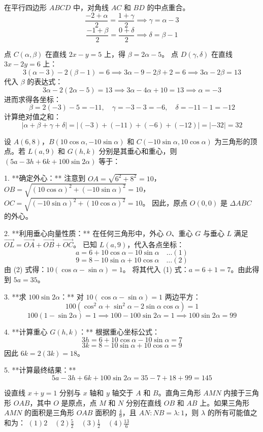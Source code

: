 \begin{questions}
\begin{solution}
在平行四边形 $ABCD$ 中，对角线 $AC$ 和 $BD$ 的中点重合。
\[
\frac{-2 + \alpha}{2} = \frac{1 + \gamma}{2} \implies \gamma = \alpha - 3
\]
\[
\frac{-1 + \beta}{2} = \frac{0 + \delta}{2} \implies \delta = \beta - 1
\]

点 $C(\alpha, \beta)$ 在直线 $2x - y = 5$ 上，得 $\beta = 2\alpha - 5$。
点 $D(\gamma, \delta)$ 在直线 $3x - 2y = 6$ 上：
\[
3(\alpha - 3) - 2(\beta - 1) = 6 \implies 3\alpha - 9 - 2\beta + 2 = 6 \implies 3\alpha - 2\beta = 13
\]
代入 $\beta$ 的表达式：
\[
3\alpha - 2(2\alpha - 5) = 13 \implies 3\alpha - 4\alpha + 10 = 13 \implies \alpha = -3
\]
进而求得各坐标：
\[
\beta = 2(-3) - 5 = -11, \quad \gamma = -3 - 3 = -6, \quad \delta = -11 - 1 = -12
\]
计算绝对值之和：
\[
|\alpha + \beta + \gamma + \delta| = |(-3) + (-11) + (-6) + (-12)| = |-32| = 32
\]
\end{solution}

\question
设 $A(6, 8)$，$B(10 \cos \alpha, -10 \sin \alpha)$ 和 $C(-10 \sin \alpha, 10 \cos \alpha)$ 为三角形的顶点。若 $L(a, 9)$ 和 $G(h, k)$ 分别是其垂心和重心，则 $(5a - 3h + 6k + 100 \sin 2\alpha)$ 等于：

\begin{solution}
1. **确定外心：**
注意到 $OA = \sqrt{6^2 + 8^2} = 10$，$OB = \sqrt{(10\cos\alpha)^2 + (-10\sin\alpha)^2} = 10$，$OC = \sqrt{(-10\sin\alpha)^2 + (10\cos\alpha)^2} = 10$。
因此，原点 $O(0, 0)$ 是 $\Delta ABC$ 的外心。

2. **利用垂心向量性质：**
在任何三角形中，外心 $O$、重心 $G$ 与垂心 $L$ 满足 $\vec{OL} = \vec{OA} + \vec{OB} + \vec{OC}$。
已知 $L(a, 9)$，代入各点坐标：
\[
a = 6 + 10\cos\alpha - 10\sin\alpha \quad \dots (1)
\]
\[
9 = 8 - 10\sin\alpha + 10\cos\alpha \quad \dots (2)
\]
由 (2) 式得：$10(\cos\alpha - \sin\alpha) = 1$。
将其代入 (1) 式：$a = 6 + 1 = 7$。由此得到 $5a = 35$。

3. **求 $100\sin 2\alpha$：**
对 $10(\cos\alpha - \sin\alpha) = 1$ 两边平方：
\[
100(\cos^2\alpha + \sin^2\alpha - 2\sin\alpha\cos\alpha) = 1
\]
\[
100(1 - \sin 2\alpha) = 1 \implies 100 - 100\sin 2\alpha = 1 \implies 100\sin 2\alpha = 99
\]

4. **计算重心 $G(h, k)$：**
根据重心坐标公式：
\[
3h = 6 + 10\cos\alpha - 10\sin\alpha = 7
\]
\[
3k = 8 - 10\sin\alpha + 10\cos\alpha = 9
\]
因此 $6k = 2(3k) = 18$。

5. **计算最终结果：**
\[
5a - 3h + 6k + 100\sin 2\alpha = 35 - 7 + 18 + 99 = 145
\]
\end{solution}
    \question
设直线 $x + y = 1$ 分别与 $x$ 轴和 $y$ 轴交于 $A$ 和 $B$。直角三角形 $AMN$ 内接于三角形 $OAB$，其中 $O$ 是原点，点 $M$ 和 $N$ 分别在直线 $OB$ 和 $AB$ 上。如果三角形 $AMN$ 的面积是三角形 $OAB$ 面积的 $\frac{4}{9}$，且 $AN : NB = \lambda : 1$，则 $\lambda$ 的所有可能值之和为：
$(1) 2 \quad (2) \frac{5}{2} \quad (3) \frac{1}{2} \quad (4) \frac{13}{6}$


\end{questions}
